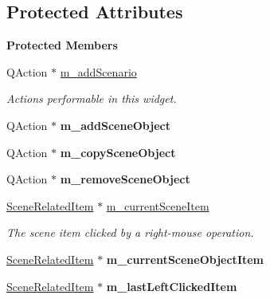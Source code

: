 \subsection*{Protected Attributes}
\begin{Indent}\textbf{ Protected Members}\par
\begin{DoxyCompactItemize}
\item 
\mbox{\label{classrev_1_1_view_1_1_scene_tree_widget_addfb16ae6e82db82fa0b73a7aa4fd3cc}} 
Q\+Action $\ast$ \mbox{\hyperlink{classrev_1_1_view_1_1_scene_tree_widget_addfb16ae6e82db82fa0b73a7aa4fd3cc}{m\+\_\+add\+Scenario}}
\begin{DoxyCompactList}\small\item\em Actions performable in this widget. \end{DoxyCompactList}\item 
\mbox{\label{classrev_1_1_view_1_1_scene_tree_widget_aca05fc393ef9f5d3c85c526e92fed63e}} 
Q\+Action $\ast$ {\bfseries m\+\_\+add\+Scene\+Object}
\item 
\mbox{\label{classrev_1_1_view_1_1_scene_tree_widget_a359939023ad5507c2be5d9d224334c80}} 
Q\+Action $\ast$ {\bfseries m\+\_\+copy\+Scene\+Object}
\item 
\mbox{\label{classrev_1_1_view_1_1_scene_tree_widget_a3d19994c463837b81af98fb478d98c4d}} 
Q\+Action $\ast$ {\bfseries m\+\_\+remove\+Scene\+Object}
\item 
\mbox{\label{classrev_1_1_view_1_1_scene_tree_widget_af584fc58c5e89df5c10a2674fcf1f251}} 
\mbox{\hyperlink{classrev_1_1_view_1_1_scene_related_item}{Scene\+Related\+Item}} $\ast$ \mbox{\hyperlink{classrev_1_1_view_1_1_scene_tree_widget_af584fc58c5e89df5c10a2674fcf1f251}{m\+\_\+current\+Scene\+Item}}
\begin{DoxyCompactList}\small\item\em The scene item clicked by a right-\/mouse operation. \end{DoxyCompactList}\item 
\mbox{\label{classrev_1_1_view_1_1_scene_tree_widget_a52af30ba4964f6893badfa4c042ab2b9}} 
\mbox{\hyperlink{classrev_1_1_view_1_1_scene_related_item}{Scene\+Related\+Item}} $\ast$ {\bfseries m\+\_\+current\+Scene\+Object\+Item}
\item 
\mbox{\label{classrev_1_1_view_1_1_scene_tree_widget_a8130da33127e5397085b028737d86f96}} 
\mbox{\hyperlink{classrev_1_1_view_1_1_scene_related_item}{Scene\+Related\+Item}} $\ast$ {\bfseries m\+\_\+last\+Left\+Clicked\+Item}
\end{DoxyCompactItemize}
\end{Indent}
